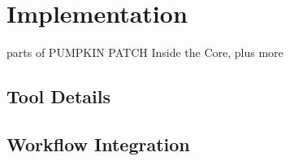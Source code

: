 \section{Implementation}

parts of PUMPKIN PATCH Inside the Core, plus more

\subsection{Tool Details}

\subsection{Workflow Integration}
